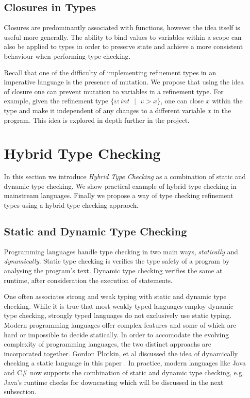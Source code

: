 \documentclass[a4paper,12pt]{report}
\begin{document}
\subsection{Closures in Types}
Closures are predominantly associated with functions, however the idea 
itself is useful more generally. The ability to bind values to variables 
within a scope can also be applied to types in order to preserve state and achieve 
a more consistent behaviour when performing type checking. 

\par
Recall that one of the difficulty of implementing refinement types in an 
imperative language is the presence of mutation. We propose that using the idea  
of closure one can prevent mutation to variables in a refinement type. For 
example, given the refinement type 
$\{\upsilon : int \text{ }|\text{ }\upsilon > x\}$, one can close $x$ within the 
type and make it independent of any changes to a different variable $x$ in the program. 
This idea is explored in depth further in the project.

\section{Hybrid Type Checking} \label{section:hybrid_type_checking}
In this section we introduce \emph{Hybrid Type Checking} \cite{hybridTypeChecking} 
as a combination of static and dynamic type checking. We show practical example 
of hybrid type checking in mainstream languages. Finally we propose a way of 
type checking refinement types using a hybrid type checking appraoch.

\subsection{Static and Dynamic Type Checking}
Programming languages handle type checking in two main ways, \textit{statically} 
and \textit{dynamically}. Static type checking is verifies the type 
safety of a program by analysing the program's text. Dynamic type checking 
verifies the same at runtime, after consideration the execution of statements. 

\par
One often associates strong and weak typing with static and dynamic type 
checking. While it is true that most weakly typed languages employ dynamic  
type checking, strongly typed languages do not exclusively use static typing. 
Modern programming languages offer complex features and some of which are hard 
or impossible to decide statically. In order to accomodate the evolving 
complexity of programming languages, the two distinct approachs are 
incorporated together. Gordon Plotkin, et al discussed the 
idea of dynamically checking a static language in this paper 
\cite{dynamicCheckStaticLanguage}. In practice, modern languages like 
Java and C# now supports the combination of static and dynamic type checking, 
e.g. Java's runtime checks for downcasting which will be 
discussed in the next subsection.
\end{document}
